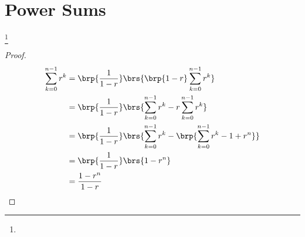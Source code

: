 

\section{Power Sums}
\begin{theorem}
\footnote{
  }
\label{thm:series_geometric}
\end{theorem}
\begin{proof}
\begin{align*}
  \sum_{k=0}^{n-1} r^k
    &= \brp{\frac{1}{1-r}}\brs{\brp{1-r}\sum_{k=0}^{n-1} r^k}
  \\&= \brp{\frac{1}{1-r}}\brs{\sum_{k=0}^{n-1} r^k - r\sum_{k=0}^{n-1} r^k}
  \\&= \brp{\frac{1}{1-r}}\brs{\sum_{k=0}^{n-1} r^k - \brp{\sum_{k=0}^{n-1} r^k -1 + r^n}}
  \\&= \brp{\frac{1}{1-r}}\brs{1 - r^n}
  \\&= \frac{1-r^n}{1-r}
\end{align*}
\end{proof}

